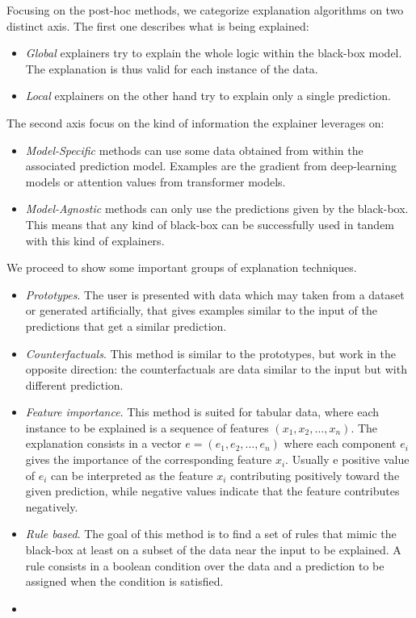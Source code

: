 \documentclass[]{marticle}
\begin{document}
Focusing on the post-hoc methods, we categorize explanation algorithms on two distinct axis. The
first one describes what is being explained:
\begin{itemize}
\item \textit{Global} explainers try to explain the whole logic within the black-box model. The
    explanation is thus valid for each instance of the data.

\item \textit{Local} explainers on the other hand try to explain only a single prediction.
\end{itemize}

The second axis focus on the kind of information the explainer leverages on:
\begin{itemize}
\item \textit{Model-Specific} methods can use some data obtained from within the associated
    prediction model. Examples are the gradient from deep-learning models or attention values from
    transformer models.

\item \textit{Model-Agnostic} methods can only use the predictions given by the black-box. This
    means that any kind of black-box can be successfully used in tandem with this kind of
    explainers.
\end{itemize}

We proceed to show some important groups of explanation techniques.

\begin{itemize}

\item \textit{Prototypes}. The user is presented with data which may taken from a dataset or
    generated artificially, that gives examples similar to the input of the predictions that get a
    similar prediction.

\item \textit{Counterfactuals}. This method is similar to the prototypes, but work in the opposite
    direction: the counterfactuals are data similar to the input but with different prediction.

\item \textit{Feature importance}. This method is suited for tabular data, where each instance to be
    explained is a sequence of features $(x_1, x_2, \dots, x_n)$. The explanation consists in a
    vector $e=(e_1, e_2, \dots, e_n)$ where each component $e_i$ gives the importance of the
    corresponding feature $x_i$. Usually e positive value of $e_i$ can be interpreted as the feature
    $x_i$ contributing positively toward the given prediction, while negative values indicate that
    the feature contributes negatively.

\item \textit{Rule based}. The goal of this method is to find a set of rules that mimic the
    black-box at least on a subset of the data near the input to be explained. A rule consists in a
    boolean condition over the data and a prediction to be assigned when the condition is satisfied.

\item {}
\end{itemize}
\end{document}
